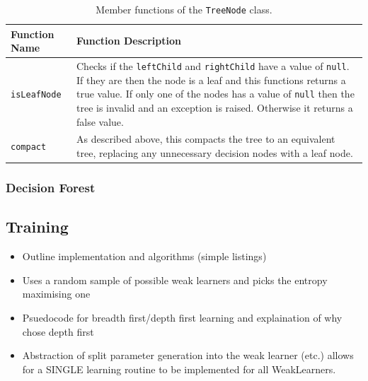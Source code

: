 \documentclass[12pt,twoside,notitlepage]{report}
\begin{document}
                \begin{table}[H]
                    \begin{tabularx}{\textwidth}{l|X}
                        \textbf{Function Name} & \textbf{Function Description} \\
                        \hline

                        \texttt{isLeafNode} & 
                            Checks if the \texttt{leftChild} and \texttt{rightChild} have a value of \texttt{null}. If 
                            they are then the node is a leaf and this functions returns a true value. If only one of the 
                            nodes has a value of \texttt{null} then the tree is invalid and an exception is raised. 
                            Otherwise it returns a false value. \\ 
                        \hline

                        \texttt{compact} & 
                            As described above, this compacts the tree to an equivalent tree, replacing any unnecessary 
                            decision nodes with a leaf node. \\ 

                    \end{tabularx}
                    \caption{Member functions of the \texttt{TreeNode} class.}
                    \label{tab:TreeNode}
                \end{table}






            \subsubsection{Decision Forest} \label{sec:DecisionForest}



      \subsection{Training} \label{sec:training}
          \begin{framed}
              \begin{itemize}
                  \item Outline implementation and algorithms (simple listings)
                  \item Uses a random sample of possible weak learners and picks the entropy maximising one
                  \item Psuedocode for breadth first/depth first learning and explaination of why chose depth first
                  \item Abstraction of split parameter generation into the weak learner (etc.) allows for a SINGLE learning routine to be implemented for all WeakLearners.
              \end{itemize}
          \end{framed}
\end{document}
